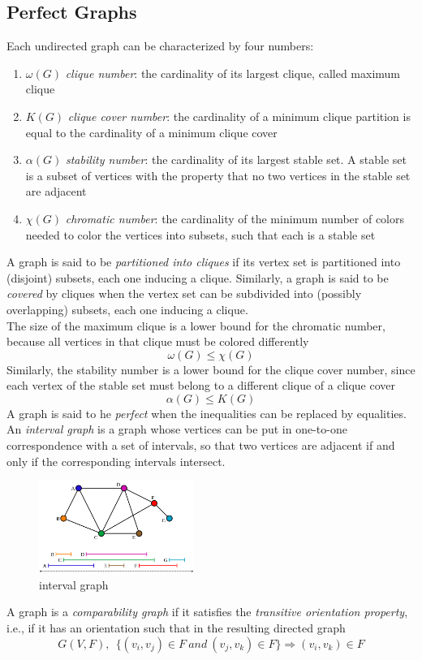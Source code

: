 \subsection{Perfect  Graphs}
Each undirected graph can be characterized by  four  numbers:
\begin{enumerate}
\item $ \omega(G) $ \textit{clique number}: the cardinality of its largest clique, called  maximum clique
\item $ K(G) $  \textit{clique cover number}: the cardinality of a minimum clique partition is equal to the cardinality of a minimum clique cover
\item $ \alpha(G) $ \textit{ stability number}: the cardinality of its largest stable set. A  stable set  is a subset of vertices with the property that no two vertices in the stable set are adjacent
\item $ \chi(G) $ \textit{chromatic number}: the cardinality of the minimum number of colors needed
to color the vertices into subsets, such that each is a stable set
\end{enumerate}
A graph is said to be  \textit{partitioned into cliques} if its vertex set is partitioned into (disjoint) subsets, each one inducing a clique. Similarly, a graph is said to be  \textit{covered} by  cliques  when the vertex set can  be  subdivided into (possibly overlapping) subsets, each one inducing a clique.\\
The size of the maximum clique is a lower bound for the chromatic number, because all vertices in that clique must be colored differently
\[ \omega(G) \leq \chi(G) \]
Similarly, the stability number is a lower bound for the clique cover number, since each vertex of the stable set must belong to a different clique of a clique cover
\[ \alpha(G) \leq K(G) \]
A graph is said to he  \textit{perfect}  when the inequalities can be replaced by equalities.
\bigskip \\
An \textit{interval graph} is a graph whose vertices can be put in one-to-one correspondence with a set of  intervals, so that two vertices are adjacent if and only if the corresponding intervals intersect.
\begin{figure}[H]
    \centering
    \includegraphics[width=0.45\textwidth]{./Cap5/Images/Image05.png}
    \caption{interval graph}
    \label{fig:intervalgraph}
\end{figure}
A graph  is a  \textit{comparability graph}  if it satisfies the  \textit{transitive orientation property},  i.e., if it has an orientation such that in the resulting directed graph
\[G(V,F),\:\: \lbrace (v_i,v_j)\in F\:and\: (v_j,v_k)\in F \rbrace \Rightarrow (v_i,v_k)\in F \]

